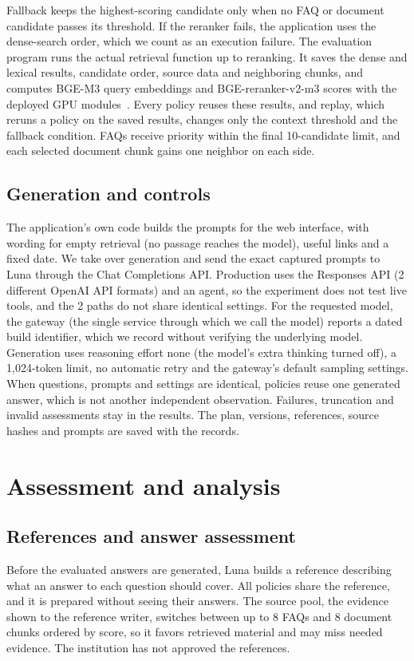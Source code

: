 \documentclass[a4paper,10pt,twocolumn]{article}
\begin{document}
Fallback keeps the highest-scoring candidate only when no FAQ or document candidate passes its threshold. If the reranker fails, the application uses the dense-search order, which we count as an execution failure. The evaluation program runs the actual retrieval function up to reranking. It saves the dense and lexical results, candidate order, source data and neighboring chunks, and computes BGE-M3 query embeddings and BGE-reranker-v2-m3 scores with the deployed GPU modules~\cite{chen2024m3,baaiBgeRerankerV2M3}. Every policy reuses these results, and replay, which reruns a policy on the saved results, changes only the context threshold and the fallback condition. FAQs receive priority within the final 10-candidate limit, and each selected document chunk gains one neighbor on each side.

\subsection{Generation and controls}
The application's own code builds the prompts for the web interface, with wording for empty retrieval (no passage reaches the model), useful links and a fixed date. We take over generation and send the exact captured prompts to Luna through the Chat Completions API. Production uses the Responses API (2 different OpenAI API formats) and an agent, so the experiment does not test live tools, and the 2 paths do not share identical settings. For the requested model, the gateway (the single service through which we call the model) reports a dated build identifier, which we record without verifying the underlying model. Generation uses reasoning effort none (the model's extra thinking turned off), a 1,024-token limit, no automatic retry and the gateway's default sampling settings. When questions, prompts and settings are identical, policies reuse one generated answer, which is not another independent observation. Failures, truncation and invalid assessments stay in the results. The plan, versions, references, source hashes and prompts are saved with the records.

\section{Assessment and analysis}
\subsection{References and answer assessment}
Before the evaluated answers are generated, Luna builds a reference describing what an answer to each question should cover. All policies share the reference, and it is prepared without seeing their answers. The source pool, the evidence shown to the reference writer, switches between up to 8 FAQs and 8 document chunks ordered by score, so it favors retrieved material and may miss needed evidence. The institution has not approved the references.
\end{document}
